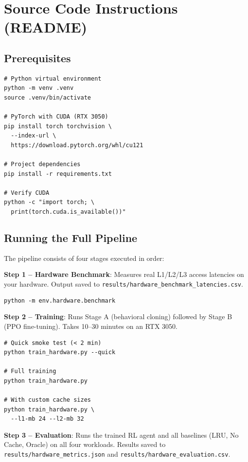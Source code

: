 \documentclass[conference]{IEEEtran}
\begin{document}
\appendix
\section{Source Code Instructions (README)}

\subsection{Prerequisites}

\begin{verbatim}
# Python virtual environment
python -m venv .venv
source .venv/bin/activate

# PyTorch with CUDA (RTX 3050)
pip install torch torchvision \
  --index-url \
  https://download.pytorch.org/whl/cu121

# Project dependencies
pip install -r requirements.txt

# Verify CUDA
python -c "import torch; \
  print(torch.cuda.is_available())"
\end{verbatim}

\subsection{Running the Full Pipeline}

The pipeline consists of four stages executed in order:

\textbf{Step 1 – Hardware Benchmark}: Measures real L1/L2/L3 access latencies on your hardware. Output saved to \texttt{results/hardware\_benchmark\_latencies.csv}.

\begin{verbatim}
python -m env.hardware.benchmark
\end{verbatim}

\textbf{Step 2 – Training}: Runs Stage A (behavioral cloning) followed by Stage B (PPO fine-tuning). Takes 10--30 minutes on an RTX 3050.

\begin{verbatim}
# Quick smoke test (< 2 min)
python train_hardware.py --quick

# Full training
python train_hardware.py

# With custom cache sizes
python train_hardware.py \
  --l1-mb 24 --l2-mb 32
\end{verbatim}

\textbf{Step 3 – Evaluation}: Runs the trained RL agent and all baselines (LRU, No Cache, Oracle) on all four workloads. Results saved to \texttt{results/hardware\_metrics.json} and \texttt{results/hardware\_evaluation.csv}.
\end{document}
